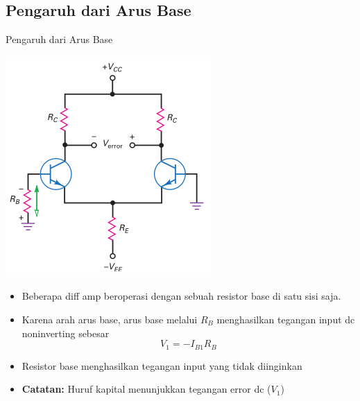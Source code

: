 \documentclass[aspectratio=169]{beamer}
\begin{document}
\subsection{Pengaruh dari Arus Base}
\begin{frame}{Pengaruh dari Arus Base}
	\begin{multicols}{2}
		\begin{center}
			\includegraphics[height=0.7\textheight]{gambar/01.diff-amp/01.base_resistor_produces_unwanted_input_voltage}
		\end{center}
		\begin{itemize}
			\item Beberapa diff amp beroperasi dengan sebuah resistor base di satu sisi saja.
			\item Karena arah arus base, arus base melalui $ R_B $ menghasilkan tegangan input dc noninverting sebesar
			\[ V_1 = -I_{B1}R_B \]
			\item Resistor base menghasilkan tegangan input yang tidak diinginkan
			\item \textbf{Catatan:} Huruf kapital menunjukkan tegangan error dc ($ V_1 $)
		\end{itemize}
	\end{multicols}
\end{frame}
\end{document}
